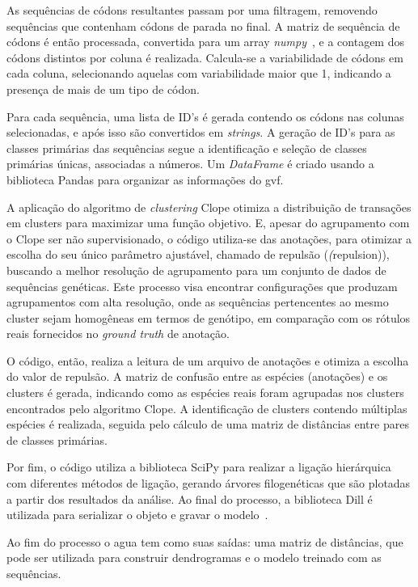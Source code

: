 As sequências de códons resultantes passam por uma filtragem, removendo sequências que contenham códons de parada no final. A matriz de sequência de códons é então processada, convertida para um array \textit{numpy}~\cite{numpy_van_2011}, e a contagem dos códons distintos por coluna é realizada. Calcula-se a variabilidade de códons em cada coluna, selecionando aquelas com variabilidade maior que 1, indicando a presença de mais de um tipo de códon.

Para cada sequência, uma lista de ID's é gerada contendo os códons nas colunas selecionadas, e após isso são convertidos em \textit{strings}. A geração de ID's para as classes primárias das sequências segue a identificação e seleção de classes primárias únicas, associadas a números. Um \textit{DataFrame} é criado usando a biblioteca Pandas para organizar as informações do \gls{gvf}.

A aplicação do algoritmo de \textit{clustering} Clope otimiza a distribuição de transações em clusters para maximizar uma função objetivo\cite{Clope_yang_2002}. E, apesar do agrupamento com o Clope ser não supervisionado, o código utiliza-se das anotações, para otimizar a escolha do seu único parâmetro ajustável, chamado de repulsão (\textit(repulsion)), buscando a melhor resolução de agrupamento para um conjunto de dados de sequências genéticas. Este processo visa encontrar configurações que produzam agrupamentos com alta resolução, onde as sequências pertencentes ao mesmo cluster sejam homogêneas em termos de genótipo, em comparação com os rótulos reais fornecidos no \textit{ground truth} de anotação.

O código, então, realiza a leitura de um arquivo de anotações e otimiza a escolha do valor de repulsão. A matriz de confusão entre as espécies (anotações) e os clusters é gerada, indicando como as espécies reais foram agrupadas nos clusters encontrados pelo algoritmo Clope. A identificação de clusters contendo múltiplas espécies é realizada, seguida pelo cálculo de uma matriz de distâncias entre pares de classes primárias.

Por fim, o código utiliza a biblioteca SciPy para realizar a ligação hierárquica com diferentes métodos de ligação, gerando árvores filogenéticas que são plotadas a partir dos resultados da análise. Ao final do processo, a biblioteca Dill é utilizada para serializar o objeto e gravar o modelo~\cite{dill}.

Ao fim do processo o \gls{agua} tem como suas saídas: uma matriz de distâncias, que pode ser utilizada para construir dendrogramas e o modelo treinado com as sequências.

